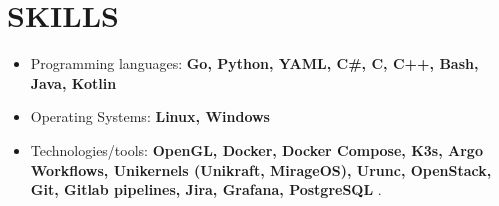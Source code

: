 \documentclass[a4paper,9pt]{extarticle}
\begin{document}
\section*{SKILLS}
\begin{itemize}
    \item Programming languages: \textbf{Go, Python, YAML, C\#, C, C++, Bash, Java, Kotlin}
    \item Operating Systems: \textbf{Linux, Windows}
    \item Technologies/tools: \textbf{OpenGL, Docker, Docker Compose, K3s, Argo Workflows, Unikernels (Unikraft, MirageOS), Urunc, OpenStack, Git, Gitlab pipelines, Jira, Grafana, PostgreSQL }.
\end{itemize}

\end{document}
